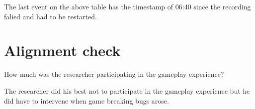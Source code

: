 The last event on the above table has the timestamp of 06:40 since the recording falied and had to be restarted.


\section{Alignment check}
How much was the researcher participating in the gameplay experience? 

The researcher did his best not to participate in the gameplay experience but he did have to intervene when game breaking bugs arose.



